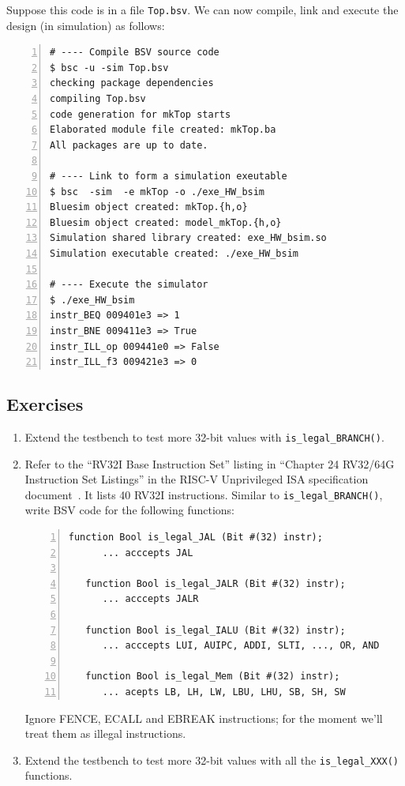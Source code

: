 Suppose this code is in a file \verb|Top.bsv|.  We can now compile,
link and execute the design (in simulation) as follows:

\begin{Verbatim}[frame=single, numbers=left]
# ---- Compile BSV source code
$ bsc -u -sim Top.bsv
checking package dependencies
compiling Top.bsv
code generation for mkTop starts
Elaborated module file created: mkTop.ba
All packages are up to date.

# ---- Link to form a simulation exeutable
$ bsc  -sim  -e mkTop -o ./exe_HW_bsim
Bluesim object created: mkTop.{h,o}
Bluesim object created: model_mkTop.{h,o}
Simulation shared library created: exe_HW_bsim.so
Simulation executable created: ./exe_HW_bsim

# ---- Execute the simulator
$ ./exe_HW_bsim
instr_BEQ 009401e3 => 1
instr_BNE 009411e3 => True
instr_ILL_op 009441e0 => False
instr_ILL_f3 009421e3 => 0
\end{Verbatim}


\subsection{Exercises}

\begin{enumerate}

\item Extend the testbench to test more 32-bit values with
\verb|is_legal_BRANCH()|.

\item Refer to the ``RV32I Base Instruction Set'' listing in ``Chapter
24 RV32/64G Instruction Set Listings'' in the RISC-V Unprivileged ISA
specification document~\cite{RISCV_Unpriv_2019_12_13}.  It lists 40
RV32I instructions.  Similar to \verb|is_legal_BRANCH()|, write BSV
code for the following functions:

\begin{Verbatim}[frame=single, numbers=left]
   function Bool is_legal_JAL (Bit #(32) instr);
      ... acccepts JAL

   function Bool is_legal_JALR (Bit #(32) instr);
      ... acccepts JALR

   function Bool is_legal_IALU (Bit #(32) instr);
      ... acccepts LUI, AUIPC, ADDI, SLTI, ..., OR, AND

   function Bool is_legal_Mem (Bit #(32) instr);
      ... acepts LB, LH, LW, LBU, LHU, SB, SH, SW
\end{Verbatim}

Ignore FENCE, ECALL and EBREAK instructions; for the moment we'll
treat them as illegal instructions.

\item Extend the testbench to test more 32-bit values with all the
\verb|is_legal_XXX()| functions.

\end{enumerate}

